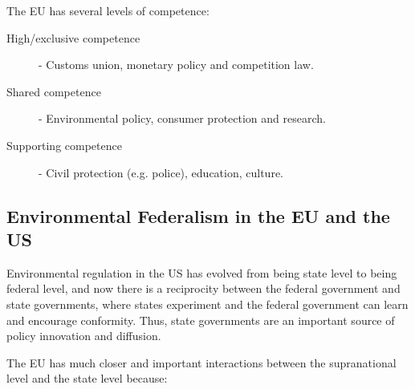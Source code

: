 

The EU has several levels of competence:
\begin{description}
  \item[High/exclusive competence]- Customs union, monetary policy and
    competition law.
  \item[Shared competence] - Environmental policy, consumer protection
    and research.
  \item[Supporting competence] - Civil protection (e.g. police),
    education, culture.
\end{description}

\subsection{Environmental Federalism in the EU and the US}

Environmental regulation in the US has evolved from being state level
to being federal level, and now there is a reciprocity between the
federal government and state governments, where states experiment and
the federal government can learn and encourage conformity. Thus, state
governments are an important source of policy innovation and
diffusion.



The EU has much closer and important interactions between the
supranational level and the state level because:


